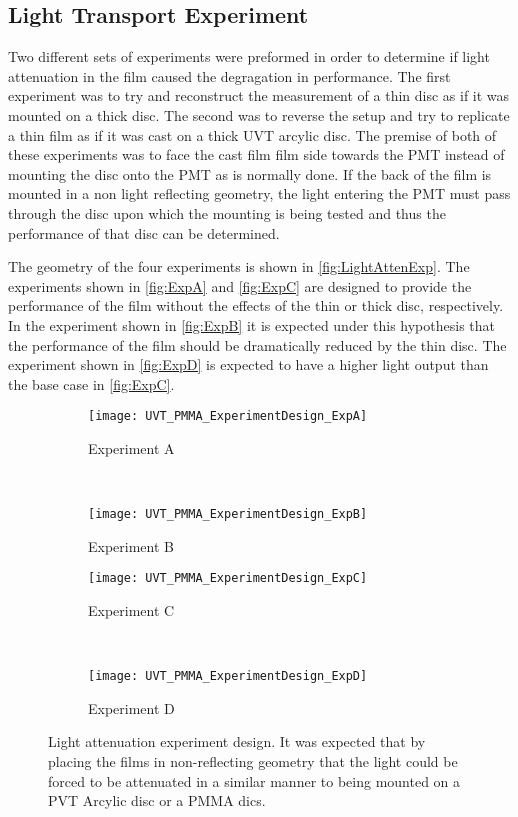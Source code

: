 \documentclass[draftcls,onecolumn]{IEEEtran}
\begin{document}
\subsection{Light Transport Experiment}
Two different sets of experiments were preformed in order to determine if light attenuation in the film caused the degragation in performance.
The first experiment was to try and reconstruct the measurement of a thin disc as if it was mounted on a thick disc.
The second was to reverse the setup and try to replicate a thin film as if it was cast on a thick UVT arcylic disc.
The premise of both of these experiments was to face the cast film film side towards the PMT instead of mounting the disc onto the PMT as is normally done.
If the back of the film is mounted in a non light reflecting geometry, the light entering the PMT must pass through the disc upon which the mounting is being tested and thus the performance of that disc can be determined.

The geometry of the four experiments is shown in \autoref{fig:LightAttenExp}.
The experiments shown in \autoref{fig:ExpA} and \autoref{fig:ExpC} are designed to provide the performance of the film without the effects of the thin or thick disc, respectively.
In the experiment shown in \autoref{fig:ExpB} it is expected under this hypothesis that the performance of the film should be dramatically reduced by the thin disc.
The experiment shown in \autoref{fig:ExpD} is expected to have a higher light output than the base case in \autoref{fig:ExpC}.
\begin{figure}
  \centering
  \begin{subfigure}[b]{0.45\textwidth}
    \centering
    \texttt{[image: UVT\_PMMA\_ExperimentDesign\_ExpA]}
    \caption{Experiment A}
    \label{fig:ExpA}
  \end{subfigure}%
  ~
  \begin{subfigure}[b]{0.45\textwidth}
    \centering
    \texttt{[image: UVT\_PMMA\_ExperimentDesign\_ExpB]}
    \caption{Experiment B}
    \label{fig:ExpB}
  \end{subfigure}%
  
  \begin{subfigure}[b]{0.45\textwidth}
    \centering
    \texttt{[image: UVT\_PMMA\_ExperimentDesign\_ExpC]}
    \caption{Experiment C}
    \label{fig:ExpC}
  \end{subfigure}%
  ~
  \begin{subfigure}[b]{0.45\textwidth}
    \centering
    \texttt{[image: UVT\_PMMA\_ExperimentDesign\_ExpD]}
    \caption{Experiment D}
    \label{fig:ExpD}
  \end{subfigure}
  \caption[Light Attenuation Experiment Design]{Light attenuation experiment design. It was expected that by placing the films in non-reflecting geometry that the light could be forced to be attenuated in a similar manner to being mounted on a PVT Arcylic disc or a PMMA dics.}
  \label{fig:LightAttenExp}
\end{figure}
\end{document}
